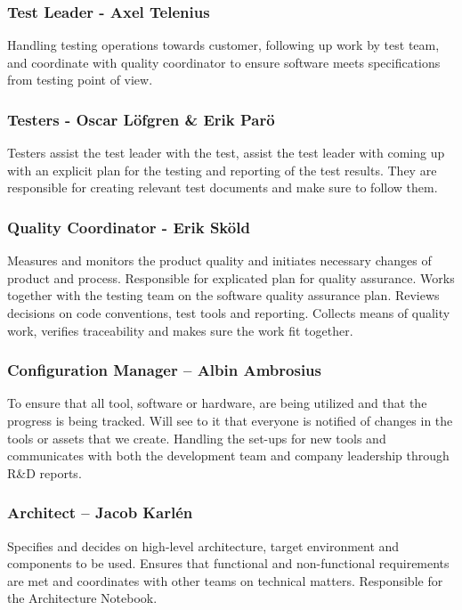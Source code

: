 \subsubsection*{Test Leader - Axel Telenius} 
Handling testing operations towards customer, following up work by test team, and coordinate with quality coordinator to ensure software meets specifications from testing point of view.

\subsubsection*{Testers - Oscar Löfgren \& Erik Parö}

Testers assist the test leader with the test, assist the test leader with coming up with an explicit plan for the testing and reporting of the test results. They are responsible for creating relevant test documents and make sure to follow them. 

\subsubsection*{Quality Coordinator - Erik Sköld} 
Measures and monitors the product quality and initiates necessary changes of product and process. Responsible for explicated plan for quality assurance. Works together with the testing team on the software quality assurance plan. Reviews decisions on code conventions, test tools and reporting. Collects means of quality work, verifies traceability and makes sure the work fit together. 

\subsubsection*{Configuration Manager – Albin Ambrosius} 
To ensure that all tool, software or hardware, are being utilized and that the progress is being tracked. Will see to it that everyone is notified of changes in the tools or assets that we create.  Handling the set-ups for new tools and communicates with both the development team and company leadership through R\&D reports.  

\subsubsection*{Architect – Jacob Karlén} 
Specifies and decides on high-level architecture, target environment and components to be used. Ensures that functional and non-functional requirements are met and coordinates with other teams on technical matters. Responsible for the Architecture Notebook.  

